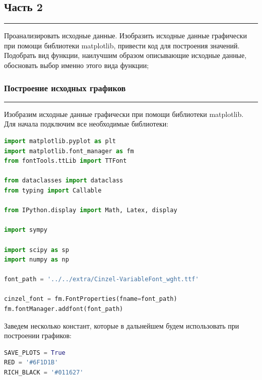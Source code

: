 \documentclass[a4paper, 14pt]{extarticle}
\begin{document}
\newpage

\subsection*{{Часть 2}}\vspace{-20pt}\rule{\linewidth}{0.1mm}

Проанализировать исходные данные. Изобразить исходные данные графически при помощи 
библиотеки matplotlib, привести код для построения значений. Подобрать вид функции, 
наилучшим образом описывающие исходные данные, обосновать выбор именно этого вида функции; \\

\subsubsection*{{Построение исходных графиков}}\vspace{-20pt}\rule{\linewidth}{0.1mm}

Изобразим исходные данные графически при помощи библиотеки matplotlib. \\
Для начала подключим все необходимые библиотеки:

\begin{center}
    \begin{lstlisting}[language=Python]
import matplotlib.pyplot as plt
import matplotlib.font_manager as fm
from fontTools.ttLib import TTFont

from dataclasses import dataclass
from typing import Callable

from IPython.display import Math, Latex, display

import sympy

import scipy as sp
import numpy as np

font_path = '../../extra/Cinzel-VariableFont_wght.ttf'

cinzel_font = fm.FontProperties(fname=font_path)
fm.fontManager.addfont(font_path)
    \end{lstlisting}
\end{center}

Заведем несколько констант, которые в дальнейшем будем использовать при построении графиков:

\begin{center}
    \begin{lstlisting}[language=Python]
SAVE_PLOTS = True
RED = '#6F1D1B'
RICH_BLACK = '#011627'
    \end{lstlisting}
\end{center}
\end{document}
